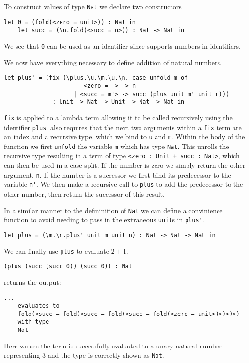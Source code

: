 \documentclass[12pt,a4paper,twoside]{report}
\begin{document}
To construct values of type \texttt{Nat} we declare two constructors
\begin{lstlisting}[gobble=4]
    let 0 = (fold(<zero = unit>)) : Nat in
    let succ = (\n.fold(<succ = n>)) : Nat -> Nat in
\end{lstlisting}
We see that \texttt{0} can be used as an identifier since \pimu{} supports numbers in identifiers.

We now have everything necessary to define addition of natural numbers.
\begin{lstlisting}[gobble=4]
    let plus' = (fix (\plus.\u.\m.\u.\n. case unfold m of 
                       <zero = _> -> n
                    | <succ = m'> -> succ (plus unit m' unit n)))
              : Unit -> Nat -> Unit -> Nat -> Nat in
\end{lstlisting}
\texttt{fix} is applied to a lambda term allowing it to be called recursively using the identifier \texttt{plus}.
\pimu{} also requires that the next two arguments within a \texttt{fix} term are an index and a recursive type, which we bind to \texttt{u} and \texttt{m}.
Within the body of the function we first \texttt{unfold} the variable \texttt{m} which has type \texttt{Nat}.
This unrolls the recursive type resulting in a term of type \lstinline{<zero : Unit + succ : Nat>}, which can then be used in a case split.
If the number is zero we simply return the other argument, \texttt{n}.
If the number is a successor we first bind its predecessor to the variable \lstinline{m'}.
We then make a recursive call to \texttt{plus} to add the predecessor to the other number, then return the successor of this result.

In a similar manner to the defininition of \texttt{Nat} we can define a convinience function to avoid needing to pass in the extraneous \texttt{unit}s in \lstinline{plus'}.
\begin{lstlisting}[gobble=4]
    let plus = (\m.\n.plus' unit m unit n) : Nat -> Nat -> Nat in
\end{lstlisting}

We can finally use \texttt{plus} to evaluate \(2 + 1\).
\begin{lstlisting}[gobble=4]
    (plus (succ (succ 0)) (succ 0)) : Nat
\end{lstlisting}
\pimu{} returns the output:
\begin{lstlisting}[gobble=4]
    ...
    evaluates to
    fold(<succ = fold(<succ = fold(<succ = fold(<zero = unit>)>)>)>)
    with type
    Nat
\end{lstlisting}
Here we see the term is successfully evaluated to a unary natural number representing \(3\) and the type is correctly shown as \texttt{Nat}.
\end{document}
